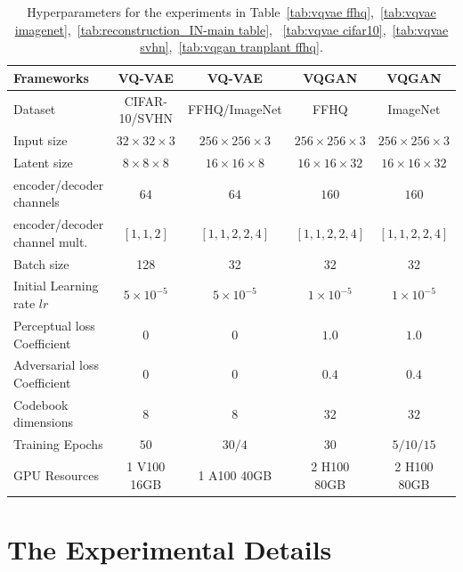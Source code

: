 \begin{table}[!h]
\centering 
\small
\vspace{-1ex}
\caption{Hyperparameters for the experiments in Table~\ref{tab:vqvae ffhq},~\ref{tab:vqvae imagenet},~\ref{tab:reconstruction_IN-main table}, ~\ref{tab:vqvae cifar10},~\ref{tab:vqvae svhn},~\ref{tab:vqgan tranplant ffhq}.}
\label{table:vqvae_hparams}
\vspace{-1ex}
\begin{tabular}{@{}lcccc@{}}
\toprule
Frameworks & VQ-VAE & VQ-VAE & VQGAN  & VQGAN\\
\midrule
\multicolumn{1}{l|}{Dataset} & CIFAR-10/SVHN & FFHQ/ImageNet & FFHQ & ImageNet \\
\multicolumn{1}{l|}{Input size} & $32\times 32\times 3$ & $256\times 256\times 3$ & $256\times 256\times 3$ & $256\times 256\times 3$\\
\multicolumn{1}{l|}{Latent size} & $8\times 8 \times 8$ & $16\times 16 \times 8$ & $16\times 16 \times 32$ & $16\times 16 \times 32$ \\
\multicolumn{1}{l|}{encoder/decoder channels} & $64$ & $64$ & $160$ & $160$\\
\multicolumn{1}{l|}{encoder/decoder channel mult.} & $[1, 1, 2]$ & $[1, 1, 2, 2, 4]$ & $[1, 1, 2, 2, 4]$ & $[1, 1, 2, 2, 4]$ \\
\multicolumn{1}{l|}{Batch size} & 128 & 32 & 32 & 32\\
\multicolumn{1}{l|}{Initial Learning rate $lr$} & $5\times 10^{-5}$ & $5\times 10^{-5}$ & $1\times 10^{-5}$ & $1\times 10^{-5}$\\
\multicolumn{1}{l|}{Perceptual loss Coefficient} & $0$ & $0$ & $1.0$ & $1.0$\\
\multicolumn{1}{l|}{Adversarial loss Coefficient} & $0$ & $0$ & $0.4$ & $0.4$\\
\multicolumn{1}{l|}{Codebook dimensions} & $8$ & $8$ & $32$  & $32$\\
\multicolumn{1}{l|}{Training Epochs} & $50$ & $30/4$ & $30$ & $5/10/15$ \\
\multicolumn{1}{l|}{GPU Resources} & 1 V100 16GB &  1 A100 40GB &  2 H100 80GB & 2 H100 80GB \\
\bottomrule
\end{tabular}
\vspace{-3ex}
\end{table}

\section{The Experimental Details} 
\label{appendix:synthetic experiment details}

